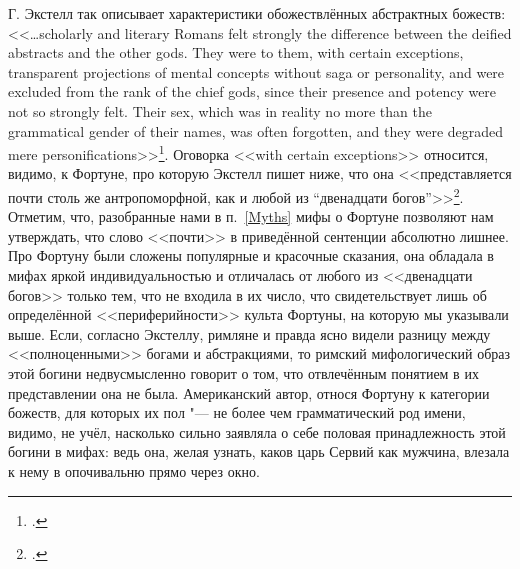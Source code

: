 



Г. Экстелл так описывает характеристики обожествлённых абстрактных божеств: <<\ldots{}scholarly and literary Romans felt strongly the difference between the deified abstracts and the other gods. They were to them, with certain exceptions, transparent projections of mental concepts without saga or personality, and were excluded from the rank of the chief gods, since their presence and potency were not so strongly felt. Their sex, which was in reality no more than the grammatical gender of their names, was often forgotten, and they were degraded mere personifications>>\footcite[P. 86]{Axtell1907}. Оговорка <<with certain exceptions>> относится, видимо, к Фортуне, про которую Экстелл пишет ниже, что она <<представляется почти столь же антропоморфной, как и любой из ``двенадцати богов''>>\footcite[P. 88]{Axtell1907}. Отметим, что, разобранные нами в п.~\ref{Myths} мифы о Фортуне позволяют нам утверждать, что слово <<почти>> в приведённой сентенции абсолютно лишнее. Про Фортуну были сложены популярные и красочные сказания, она обладала в мифах яркой индивидуальностью и отличалась от любого из <<двенадцати богов>> только тем, что не входила в их число, что свидетельствует лишь об определённой <<периферийности>> культа Фортуны, на которую мы указывали выше. Если, согласно Экстеллу, римляне и правда ясно видели разницу между <<полноценными>> богами и абстракциями, то римский мифологический образ этой богини недвусмысленно говорит о том, что отвлечённым понятием в их представлении она не была. Американский автор, относя Фортуну к категории божеств, для которых их пол "--- не более чем грамматический род имени, видимо, не учёл, насколько сильно заявляла о себе половая принадлежность этой богини в мифах: ведь она, желая узнать, каков царь Сервий как мужчина, влезала к нему в опочивальню прямо через окно.

